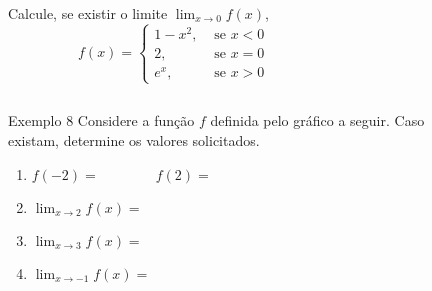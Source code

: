 \begin{frame}
  \begin{columns}[onlytextwidth]
    \begin{column}{0.49\textwidth}\vspace{-0.5cm}
      \begin{example}
        Calcule, se existir o limite $\lim_{x\to 0}{f(x)}$, 
        \begin{equation*}
          f(x) = \begin{cases}
            1 - x^{2}, &\mbox{ se } x < 0 \\
            2, &\mbox{ se } x = 0 \\
            e^{x}, &\mbox{ se } x > 0
          \end{cases}
        \end{equation*}
      \end{example}
    \end{column}
    \begin{column}{0.49\textwidth}\vspace{-0.85cm}
      \begin{figure}
      \end{figure}
    \end{column}
  \end{columns}
\end{frame}

\begin{frame}
  \begin{columns}[onlytextwidth]
    \begin{column}{0.49\textwidth}\vspace{-0.5cm}
      \begin{block}{Exemplo 8}
        Considere a função $f$ definida pelo gráfico a seguir. Caso existam, determine os valores solicitados.
      \end{block}
      \begin{enumerate}\small
        \item $f(-2) = \qquad\qquad f(2) = $\vspace{0.5cm}
        \item $\displaystyle\lim_{x\to 2}f(x) = $\vspace{0.8cm}
        \item $\displaystyle\lim_{x\to 3}f(x) = $\vspace{0.8cm}
        \item $\displaystyle\lim_{x\to -1}f(x) = $
      \end{enumerate}
    \end{column}
    \begin{column}{0.49\textwidth}\vspace{-0.85cm}
      \begin{figure}
      \end{figure}
    \end{column}
  \end{columns}
\end{frame}
